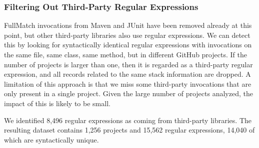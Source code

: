 \subsubsection{Filtering Out Third-Party Regular Expressions}
FullMatch invocations from Maven and JUnit have been removed already at this point, but other third-party libraries also use regular expressions. 
We can detect this by looking for syntactically identical regular expressions with invocations on the same file, same class, same method, but in different GitHub projects. 
If the number of projects is larger than one, then it is regarded as a third-party regular expression, and all records related to the same stack information are dropped. 
A limitation of this approach is that we miss some third-party invocations that are only present in a single project. Given the large number of projects analyzed, the impact of this is likely to be small. 
 
 We identified 8,496 regular expressions as coming from third-party libraries. %
 The resulting dataset contains 1,256 projects and 15,562 regular expressions, 14,040 of which are syntactically unique. %

